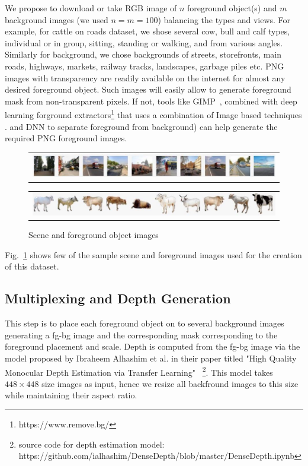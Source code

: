 \documentclass[review]{cvpr}
\begin{document}
We propose to download or take RGB image of $n$ foreground object(s) and $m$ background images (we used $n=m=100$)
balancing the types and views. For example, for cattle on roads dataset, we shose several cow, bull and calf types, individual
 or in group, sitting, standing or walking, and from various angles. Similarly for background, we chose backgrounds of streets, 
 storefronts, main roads, highways, markets, railway tracks, landscapes, garbage piles etc.
PNG images with transparency are readily available on the internet for almost any desired foreground object.
Such images will easily allow to generate foreground mask from non-transparent pixels. 
If not, tools like GIMP~\cite{howat2014greenland}, combined with deep learning forground extractors\footnote{https://www.remove.bg/}
that uses a combination of Image based techniques .
and DNN to separate foreground from background) can help generate the required PNG foreground images.

\begin{figure}
  \begin{center}
  \begin{tabular}{@{}c@{}}
    \includegraphics[width=1.0\linewidth]{bgimages.jpg}
  \end{tabular}
  \begin{tabular}{@{}c@{}}
      \includegraphics[width=1.0\linewidth]{fgimages.jpg}
  \end{tabular}
  \end{center}
  \caption{Scene and foreground object images}
  \label{fig:sceneandfg}
\end{figure}

Fig.~\ref{fig:sceneandfg} shows few of the sample scene and foreground images used for the creation of this dataset. 

\subsection{Multiplexing and Depth Generation}

This step is to place each foreground object on to several background images generating a fg-bg image and the corresponding mask
corresponding to the foreground placement and scale. Depth is computed from the fg-bg image via the model proposed by 
Ibraheem Alhashim et al. in their paper titled "High Quality Monocular Depth Estimation via Transfer Learning"
~\cite{alhashim2018high}\footnote{source code for depth estimation model: https://github.com/ialhashim/DenseDepth/blob/master/DenseDepth.ipynb}. 
This model takes $448\times448$ size images as input, hence we resize all backfround images to this size while maintaining their aspect ratio.
\end{document}
